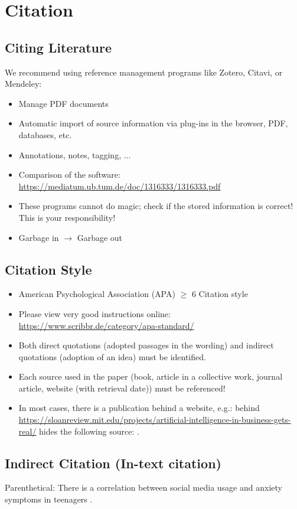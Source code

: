 \section{Citation}

\subsection{Citing Literature}
We recommend using reference management programs like Zotero, Citavi, or Mendeley:
\begin{itemize}
    \item Manage PDF documents
    \item Automatic import of source information via plug-ins in the browser, PDF, databases, etc.
    \item Annotations, notes, tagging, ...
    \item Comparison of the software: \url{https://mediatum.ub.tum.de/doc/1316333/1316333.pdf}
    \item These programs cannot do magic; check if the stored information is correct! This is your responsibility!
    \item Garbage in \( \rightarrow \) Garbage out
\end{itemize}

\subsection{Citation Style}
\begin{itemize}
    \item American Psychological Association (APA) \( \geq \) 6 Citation style
    \item Please view very good instructions online: \url{https://www.scribbr.de/category/apa-standard/}
    \item Both direct quotations (adopted passages in the wording) and indirect quotations (adoption of an idea) must be identified.
    \item Each source used in the paper (book, article in a collective work, journal article, website (with retrieval date)) must be referenced!
    \item In most cases, there is a publication behind a website, e.g.: behind \url{https://sloanreview.mit.edu/projects/artificial-intelligence-in-business-gets-real/} hides the following source: \textcite{ransbotham2018}.
\end{itemize}

\subsection{Indirect Citation (In-text citation)}
Parenthetical: There is a correlation between social media usage and anxiety symptoms in teenagers \parencite{barr1999}.

